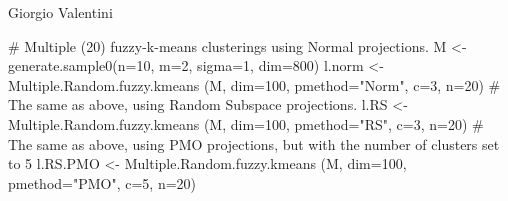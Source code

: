 \documentclass{article}
\begin{document}
\begin{Author}\relax
Giorgio Valentini 
\end{Author}
\begin{Examples}
\begin{ExampleCode}
# Multiple (20) fuzzy-k-means clusterings using Normal projections. 
M <- generate.sample0(n=10, m=2, sigma=1, dim=800)
l.norm <- Multiple.Random.fuzzy.kmeans (M, dim=100, pmethod="Norm", c=3, n=20)
# The same as above, using Random Subspace projections.
l.RS <-  Multiple.Random.fuzzy.kmeans (M, dim=100, pmethod="RS", c=3,  n=20)
# The same as above, using PMO projections, but with the number of clusters set to 5
l.RS.PMO <-  Multiple.Random.fuzzy.kmeans (M, dim=100, pmethod="PMO", c=5, n=20)
\end{ExampleCode}
\end{Examples}
\end{document}
